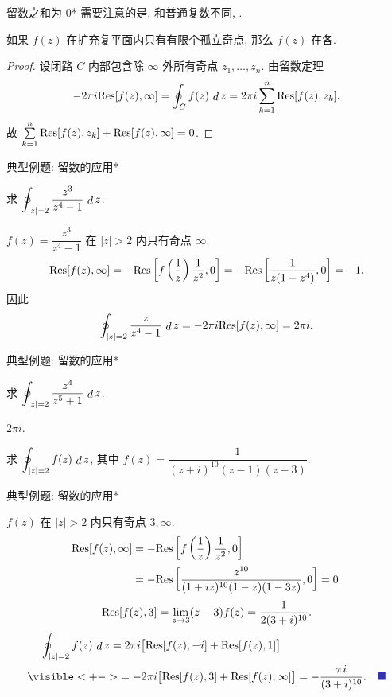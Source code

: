 \begin{frame}{留数之和为 $0$*}
\onslide<+->
需要注意的是, 和普通复数不同, .

\begin{theorem}
如果 $f(z)$ 在扩充复平面内只有有限个孤立奇点, 那么 $f(z)$ 在各.
\end{theorem}
\begin{proof}
设闭路 $C$ 内部包含除 $\infty$ 外所有奇点 $z_1,\dots,z_n$.
\onslide<+->
由留数定理
\[-2\pi i{\mathrm{Res}}[f(z),\infty]=\oint_C f(z)\,\mathop{d} z=2\pi i\sum_{k=1}^n{\mathrm{Res}}[f(z),z_k].\]
\onslide<+->
故 $\sum\limits_{k=1}^n{\mathrm{Res}}[f(z),z_k]+{\mathrm{Res}}[f(z),\infty]=0$.
\end{proof}
\end{frame}


\begin{frame}{典型例题: 留数的应用*}
\begin{example}
求 $\displaystyle\oint_{|z|=2}\frac{z^3}{z^4-1}\,\mathop{d} z$.
\end{example}
\begin{solution}
$f(z)=\dfrac{z^3}{z^4-1}$ 在 $|z|>2$ 内只有奇点 $\infty$.
\onslide<+->
\[{\mathrm{Res}}[f(z),\infty]=-{\mathrm{Res}}\left[f\left(\frac1z\right)\frac1{z^2},0\right]
=-{\mathrm{Res}}\left[\frac1{z(1-z^4)},0\right]=-1.\]
\onslide<+->
因此
\[\oint_{|z|=2}\frac z{z^4-1}\,\mathop{d} z=-2\pi i{\mathrm{Res}}[f(z),\infty]=2\pi i.\qedhere\]
\end{solution}
\end{frame}


\begin{frame}{典型例题: 留数的应用*}
\begin{exercise}
求 $\displaystyle\oint_{|z|=2}\frac{z^4}{z^5+1}\,\mathop{d} z$.
\end{exercise}
\begin{answer}
$2\pi i$.
\end{answer}
\begin{example}
求 $\displaystyle\oint_{|z|=2}f(z)\,\mathop{d} z$, 其中 $f(z)=\dfrac1{(z+i)^{10}(z-1)(z-3)}$.
\end{example}
\end{frame}


\begin{frame}{典型例题: 留数的应用*}
\beqskip{7pt}
\begin{solutions}
$f(z)$ 在 $|z|>2$ 内只有奇点 $3,\infty$.
\onslide<+->
\begin{align*}
{\mathrm{Res}}[f(z),\infty]&=-{\mathrm{Res}}\left[f\left(\frac1z\right)\frac1{z^2},0\right]\\
&=-{\mathrm{Res}}\left[\frac{z^{10}}{(1+iz)^{10}(1-z)(1-3z)},0\right]=0.\end{align*}
\onslide<+->
\[{\mathrm{Res}}[f(z),3]=\lim_{z\to3}(z-3)f(z)=\frac1{2(3+i)^{10}}.\]
\onslide<+->
\vspace{-\baselineskip}
\begin{align*}
&\peq\oint_{|z|=2}f(z)\diff z=2\pi i\bigl[\Res[f(z),-i]+\Res[f(z),1]\bigr]\\
&\visible<+->{=-2\pi i\bigl[\Res[f(z),3]+\Res[f(z),\infty]\bigr]=-\frac{\pi i}{(3+i)^{10}}.\mqed}
\end{align*}
\end{solutions}
\endgroup
\end{frame}



